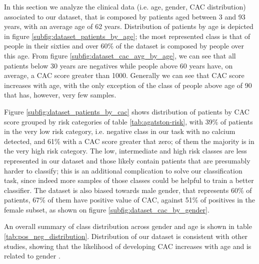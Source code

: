 In this section we analyze the clinical data (i.e. age, gender, CAC distribution) associated to our dataset, that is composed by patients aged between 3 and 93 years, with an average age of 62 years.
Distribution of patients by age is depicted in figure \ref{subfig:dataset_patients_by_age}; the most represented class is that of people in their sixties and over 60\% of the dataset is composed by people over this age.
From figure \ref{subfig:dataset_cac_avg_by_age}, we can see that all patients below 30 years are negatives while people above 60 years have, on average, a CAC score greater than 1000.
Generally we can see that CAC score increases with age, with the only exception of the class of people above age of 90 that has, however, very few samples.

Figure \ref{subfig:dataset_patients_by_cac} shows distribution of patients by CAC score grouped by risk categories of table \ref{tab:agatston-risk}, with 39\% of patients in the very low risk category, i.e. negative class in our task with no calcium detected, and 61\% with a CAC score greater that zero; of them the majority is in the very high risk category.
The low, intermediate and high risk classes are less represented in our dataset and those likely contain patients that are presumably harder to classify; this is an additional complication to solve our classification task, since indeed more samples of those classes could be helpful to train a better classifier.
The dataset is also biased towards male gender, that represents 60\% of patients,  67\% of them have positive value of CAC, against 51\% of positives in the female subset, as shown on figure \ref{subfig:dataset_cac_by_gender}.

An overall summary of class distribution across gender and age is shown in table \ref{tab:pos_neg_distribution}.
Distribution of our dataset is consistent with other studies, showing that the likelihood of developing CAC increases with age and is related to gender \cite{Czaja-Ziolkowska2022-pd}.

